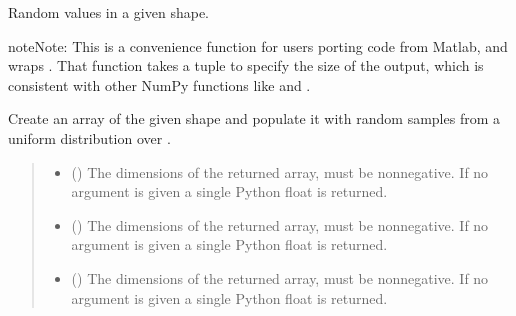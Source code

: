 \documentclass[letterpaper,10pt,english]{sphinxmanual}
\begin{document}

\begin{fulllineitems}
\label{\detokenize{metilda.controllers:metilda.controllers.pitch_art_wizard.rand}}
\pysigstartsignatures
{}
\pysigstopsignatures
\sphinxAtStartPar
Random values in a given shape.

\begin{sphinxadmonition}{note}{Note:}
\sphinxAtStartPar
This is a convenience function for users porting code from Matlab,
and wraps . That function takes a
tuple to specify the size of the output, which is consistent with
other NumPy functions like  and .
\end{sphinxadmonition}

\sphinxAtStartPar
Create an array of the given shape and populate it with
random samples from a uniform distribution
over \sphinxcode{\sphinxupquote{{[}0, 1)}}.
\begin{quote}\begin{description}
\begin{itemize}
\item {} 
\sphinxAtStartPar
{} (\sphinxstyleliteralemphasis{\sphinxupquote{, }}) \textendash{} The dimensions of the returned array, must be non\sphinxhyphen{}negative.
If no argument is given a single Python float is returned.

\item {} 
\sphinxAtStartPar
{} (\sphinxstyleliteralemphasis{\sphinxupquote{, }}) \textendash{} The dimensions of the returned array, must be non\sphinxhyphen{}negative.
If no argument is given a single Python float is returned.

\item {} 
\sphinxAtStartPar
{} (\sphinxstyleliteralemphasis{\sphinxupquote{, }}) \textendash{} The dimensions of the returned array, must be non\sphinxhyphen{}negative.
If no argument is given a single Python float is returned.


\end{itemize}
\end{description}
\end{quote}
\end{fulllineitems}
\end{document}
